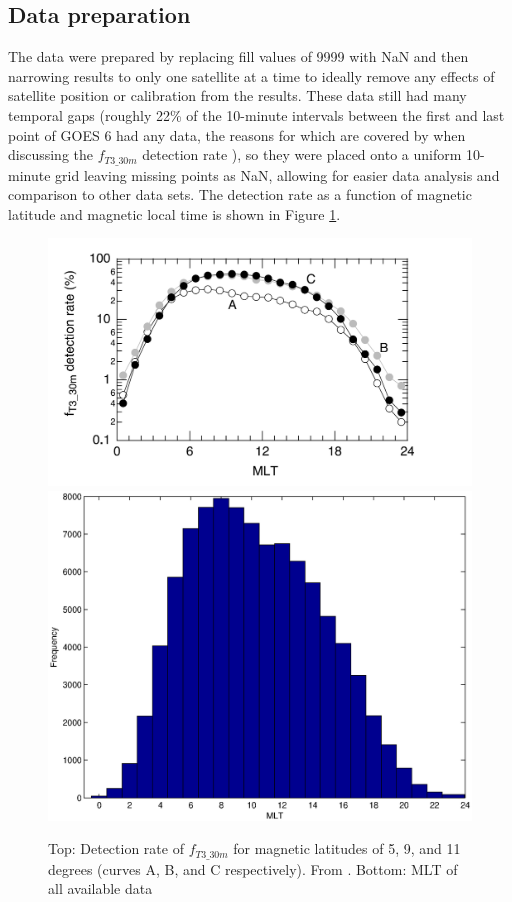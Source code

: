 \subsection{Data preparation}
The data were prepared by replacing fill values of 9999 with NaN and then narrowing results to only one satellite at a time to ideally remove any effects of satellite position or calibration from the results. These data still had many temporal gaps (roughly 22\% of the 10-minute intervals between the first and last point of GOES 6 had any data, the reasons for which are covered by \cite{Takahashi2010SolarCycleVariation} when discussing the $f_{T3\_30m}$ detection rate ), so they were placed onto a uniform 10-minute grid leaving missing points as NaN, allowing for easier data analysis and comparison to other data sets. The detection rate as a function of magnetic latitude and magnetic local time is shown in Figure \ref{fig:Takahashi2010Availability}.

\begin{figure}[htp!]
	\centering
	\includegraphics[width=0.8\linewidth]{Figures/Takahashi2010Availability.png}
	\includegraphics[width=0.8\linewidth]{Figures/databyMLT}
	\caption{Top: Detection rate of $f_{T3\_30m}$ for magnetic latitudes of 5, 9, and 11 degrees (curves A, B, and C respectively). From \citep{Takahashi2010SolarCycleVariation}. Bottom: MLT of all available data}
	\label{fig:Takahashi2010Availability}
\end{figure}


